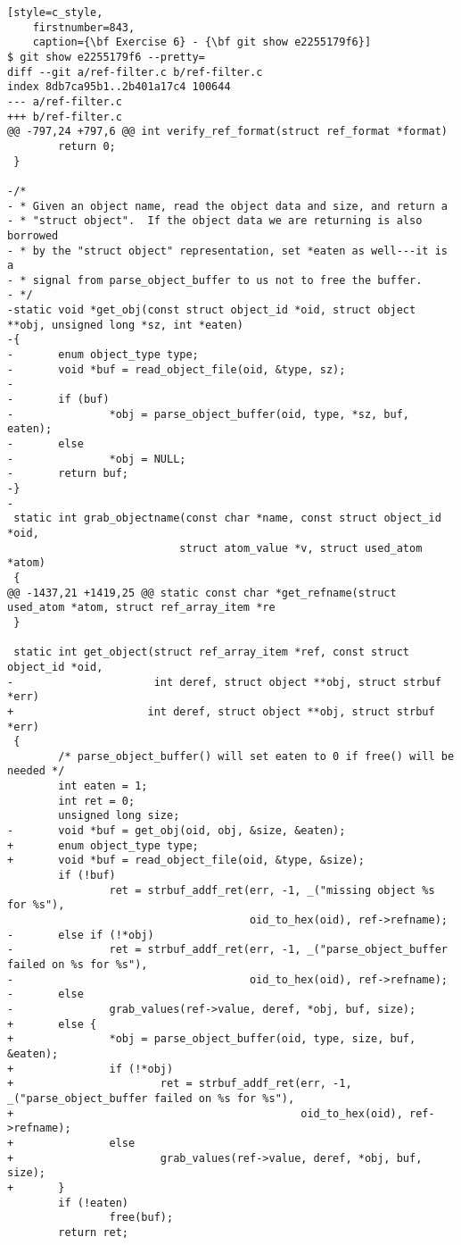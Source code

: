 \begin{lstlisting}[style=c_style,
	firstnumber=843,
	caption={\bf Exercise 6} - {\bf git show e2255179f6}]
$ git show e2255179f6 --pretty=
diff --git a/ref-filter.c b/ref-filter.c
index 8db7ca95b1..2b401a17c4 100644
--- a/ref-filter.c
+++ b/ref-filter.c
@@ -797,24 +797,6 @@ int verify_ref_format(struct ref_format *format)
        return 0;
 }
 
-/*
- * Given an object name, read the object data and size, and return a
- * "struct object".  If the object data we are returning is also borrowed
- * by the "struct object" representation, set *eaten as well---it is a
- * signal from parse_object_buffer to us not to free the buffer.
- */
-static void *get_obj(const struct object_id *oid, struct object **obj, unsigned long *sz, int *eaten)
-{
-       enum object_type type;
-       void *buf = read_object_file(oid, &type, sz);
-
-       if (buf)
-               *obj = parse_object_buffer(oid, type, *sz, buf, eaten);
-       else
-               *obj = NULL;
-       return buf;
-}
-
 static int grab_objectname(const char *name, const struct object_id *oid,
                           struct atom_value *v, struct used_atom *atom)
 {
@@ -1437,21 +1419,25 @@ static const char *get_refname(struct used_atom *atom, struct ref_array_item *re
 }
 
 static int get_object(struct ref_array_item *ref, const struct object_id *oid,
-                      int deref, struct object **obj, struct strbuf *err)
+                     int deref, struct object **obj, struct strbuf *err)
 {
        /* parse_object_buffer() will set eaten to 0 if free() will be needed */
        int eaten = 1;
        int ret = 0;
        unsigned long size;
-       void *buf = get_obj(oid, obj, &size, &eaten);
+       enum object_type type;
+       void *buf = read_object_file(oid, &type, &size);
        if (!buf)
                ret = strbuf_addf_ret(err, -1, _("missing object %s for %s"),
                                      oid_to_hex(oid), ref->refname);
-       else if (!*obj)
-               ret = strbuf_addf_ret(err, -1, _("parse_object_buffer failed on %s for %s"),
-                                     oid_to_hex(oid), ref->refname);
-       else
-               grab_values(ref->value, deref, *obj, buf, size);
+       else {
+               *obj = parse_object_buffer(oid, type, size, buf, &eaten);
+               if (!*obj)
+                       ret = strbuf_addf_ret(err, -1, _("parse_object_buffer failed on %s for %s"),
+                                             oid_to_hex(oid), ref->refname);
+               else
+                       grab_values(ref->value, deref, *obj, buf, size);
+       }
        if (!eaten)
                free(buf);
        return ret;
\end{lstlisting}

